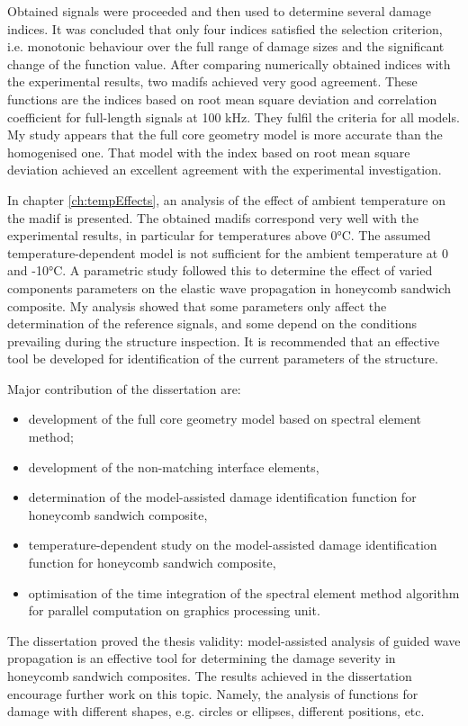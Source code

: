Obtained signals were proceeded and then used to determine several damage indices.
It was concluded that only four indices satisfied the selection criterion, i.e. monotonic behaviour over the full range of damage sizes and the significant change of the function value.
After comparing numerically obtained indices with the experimental results, two \acfp{madif} achieved very good agreement.
These functions are the indices based on root mean square deviation and correlation coefficient for full-length signals at 100 kHz. They fulfil the criteria for all models.
My study appears that the full core geometry model is more accurate than the homogenised one.
That model with the index based on root mean square deviation achieved an excellent agreement with the experimental investigation.

In chapter \ref{ch:tempEffects}, an analysis of the effect of ambient temperature on the \ac{madif} is presented.
The obtained \acp{madif} correspond very well with the experimental results, in particular for temperatures above 0\unit{\degreeCelsius}.
The assumed temperature-dependent model is not sufficient for the ambient temperature at 0 and -10\unit{\degreeCelsius}.
A parametric study followed this to determine the effect of varied components parameters on the elastic wave propagation in honeycomb sandwich composite. 
My analysis showed that some parameters only affect the determination of the reference signals, and some depend on the conditions prevailing during the structure inspection.
It is recommended that an effective tool be developed for identification of the current parameters of the structure.

Major contribution of the dissertation are:
\begin{itemize}
	\item development of the full core geometry model based on spectral element method;
	\item development of the non-matching interface elements,
	\item determination of the model-assisted damage identification function for honeycomb sandwich composite,
	\item temperature-dependent study on the model-assisted damage identification function for honeycomb sandwich composite,
	\item optimisation of the time integration of the spectral element method algorithm for parallel computation on graphics processing unit.
\end{itemize}

The dissertation proved the thesis validity: model-assisted analysis of guided wave propagation is an effective tool for determining the damage severity in honeycomb sandwich composites.
The results achieved in the dissertation encourage further work on this topic.
Namely, the analysis of functions for damage with different shapes, e.g. circles or ellipses, different positions, etc.
